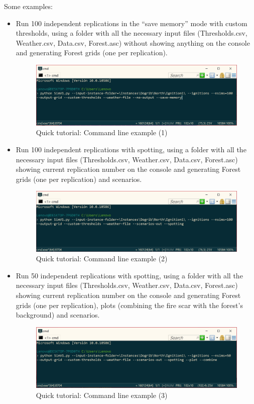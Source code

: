\documentclass[11pt]{article}
\begin{document}
Some examples:
\begin{itemize}
	\item Run 100 independent replications in the ``save memory'' mode with custom thresholds, using a folder with all the necessary input files (Thresholds.csv, Weather.csv, Data.csv, Forest.asc) without showing anything on the console and generating Forest grids (one per replication). 
	
\begin{figure}[h!]
\centering
\includegraphics[scale=0.6]{CMD1.png}
\caption{\label{fig:CMD1} Quick tutorial: Command line example (1)}
\end{figure}

	
	\item Run 100 independent replications with spotting, using a folder with all the necessary input files (Thresholds.csv, Weather.csv, Data.csv, Forest.asc) showing current replication number on the console and generating Forest grids (one per replication) and scenarios.  
	
\begin{figure}[h!]
\centering
\includegraphics[scale=0.6]{CMD2.png}
\caption{\label{fig:CMD2} Quick tutorial: Command line example (2)}
\end{figure}
	
		\item Run 50 independent replications with spotting, using a folder with all the necessary input files (Thresholds.csv, Weather.csv, Data.csv, Forest.asc) showing current replication number on the console and generating Forest grids (one per replication), plots (combining the fire scar with the forest's background) and scenarios. 
	
\begin{figure}[h!]
\centering
\includegraphics[scale=0.6]{CMD3.png}
\caption{\label{fig:CMD3} Quick tutorial: Command line example (3)}
\end{figure}
	
\end{itemize}
\end{document}
